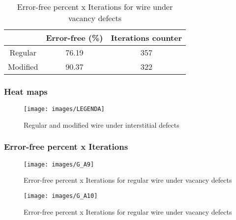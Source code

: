 \begin{table}[h]
\begin{center}
\begin{tabular}{|c|c|c|}
\hline
 & Error-free (\%) & Iterations counter \\
\hline
 Regular & 76.19 & 357 \\
\hline
 Modified & 90.37 & 322 \\
\hline

\end{tabular}
\caption{Error-free percent x Iterations for wire under vacancy defects}
\end{center}
\end{table}

\pagebreak
\subsubsection{Heat maps}

\begin{figure}[h]
\center
{}
\hfill
{}
\linebreak
{\texttt{[image: images/LEGENDA]}
}
\caption{Regular and modified wire under interstitial defects}
\label{figure:wire_t5}
\end{figure}

\subsubsection{Error-free percent x Iterations}

\begin{figure}[h!]
\center
\texttt{[image: images/G\_A9]}
\caption{Error-free percent x Iterations for regular wire under vacancy defects}
\label{figure:wire_reg_gt5}
\end{figure}

\begin{figure}[h!]
\center
\texttt{[image: images/G\_A10]}
\caption{Error-free percent x Iterations for regular wire under vacancy defects}
\label{figure:wire_mod_gt5}
\end{figure}
\pagebreak